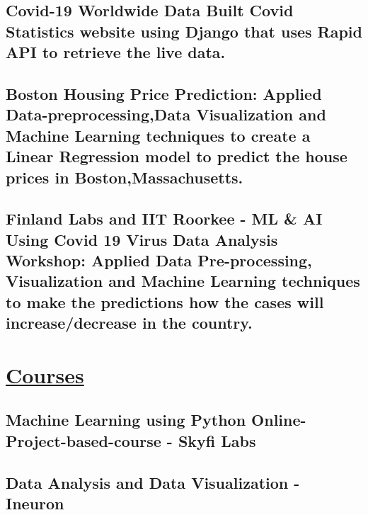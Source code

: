 \documentclass{article}
\begin{document}
\subsection{\textbf{Covid-19 Worldwide Data}
    \textmd{Built Covid Statistics website using Django that uses Rapid API to retrieve the live data.}}

\subsection{\textbf{Boston Housing Price Prediction:}
    \textmd{Applied Data-preprocessing,Data Visualization and Machine Learning techniques to create a
        Linear Regression model to predict the house prices in Boston,Massachusetts. } }

\subsection{\textbf{Finland Labs and IIT Roorkee - ML \& AI Using Covid 19 Virus Data Analysis Workshop:}
    \textmd{Applied Data Pre-processing, Visualization and Machine Learning techniques to make the predictions how the cases will increase/decrease in the country. } }


\section{\underline{Courses}}


\subsection{\textbf{Machine Learning using Python Online-Project-based-course }
    \textmd{- Skyfi Labs}}

\subsection{\textbf{Data Analysis and Data Visualization}
    \textmd{- Ineuron}}
\end{document}
